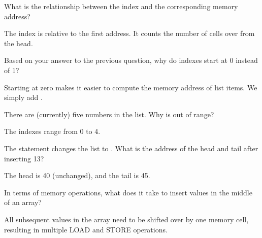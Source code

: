 \Q What is the relationship between the index and the corresponding memory address?

\begin{answer}
The index is relative to the first address.
It counts the number of cells over from the head.
\end{answer}


\Q Based on your answer to the previous question, why do indexes start at 0 instead of 1?

\begin{answer}
Starting at zero makes it easier to compute the memory address of list items.
We simply add .
\end{answer}


\Q There are (currently) five numbers in the list. Why is  out of range?

\begin{answer}
The indexes range from 0 to 4.
\end{answer}


\Q The statement  changes the list to \pyth{[29, 16, 13, 23, 47, 37]}.
What is the address of the head and tail after inserting 13?

\begin{answer}
The head is 40 (unchanged), and the tail is 45.
\end{answer}


\Q In terms of memory operations, what does it take to insert values in the middle of an array?

\begin{answer}
All subsequent values in the array need to be shifted over by one memory cell, resulting in multiple LOAD and STORE operations.
\end{answer}
